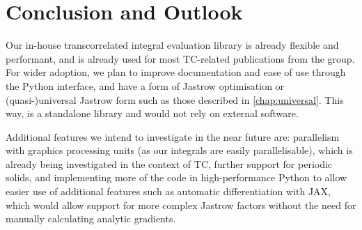 \section{Conclusion and Outlook}

Our in-house transcorrelated integral evaluation library is already flexible and performant, and is already used for most TC-related publications from the group. For wider adoption, we plan to improve documentation and ease of use through the Python interface, and have a form of Jastrow optimisation or (quasi-)universal Jastrow form such as those described in \autoref{chap:universal}. This way, \pytchint is a standalone library and would not rely on external software.

Additional features we intend to investigate in the near future are: parallelism with graphics processing units (as our integrals are easily parallelisable), which is already being investigated in the context of TC, further support for periodic solids, and implementing more of the code in high-performance Python to allow easier use of additional features such as automatic differentiation\supercite{wengertSimple1964} with JAX,\supercite{jax2018github} which would allow support for more complex Jastrow factors without the need for manually calculating analytic gradients.
